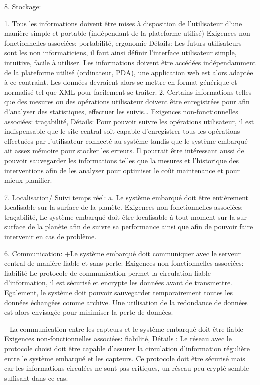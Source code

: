 8. Stockage:

1. Tous les informations doivent être mises à disposition de l'utilisateur d'une manière simple et portable (indépendant de la plateforme utilisé)
Exigences non-fonctionnelles associées: portabilité,  ergonomie
Détails: Les futurs utilisateurs sont les non informaticiens, il faut ainsi définir l’interface utilisateur simple, intuitive, facile à utiliser. Les informations doivent être accédées indépendamment de la plateforme utilisé (ordinateur, PDA), une application web est alors adaptée à ce contraint.  Les données devraient alors se mettre en format générique et normalisé tel que XML pour facilement se traiter.
2. Certains informations telles que des mesures ou des opérations utilisateur doivent être enregistrées pour afin d’analyser des statistiques, effectuer les suivis… 
Exigences non-fonctionnelles associées: traçabilité, 
Détails: Pour pouvoir suivre les opérations utilisateur, il est indispensable que le site central soit capable d’enregistrer tous les opérations effectuées par l’utilisateur connecté au système tandis que le système embarqué ait assez mémoire pour stocker les erreurs. Il pourrait être intéressant aussi de pouvoir sauvegarder les informations telles que la mesures et l’historique des interventions afin de les analyser pour optimiser le coût maintenance et pour mieux planifier.  

7. Localisation/ Suivi temps réel:
 a. Le système embarqué doit être entièrement localisable sur la surface de la planète. 
Exigences non-fonctionnelles associées: traçabilité, 
Le système embarqué doit être localisable à tout moment sur la sur surface de la planète afin de suivre sa performance ainsi que afin de pouvoir faire intervenir en cas de problème. 

6. Communication:
+Le système embarqué doit communiquer avec le serveur central de manière fiable et sans perte:
Exigences non-fonctionnelles associées: fiabilité 
Le protocole de communication permet la circulation fiable d’information, il est sécurisé et encrypte les données avant de transmettre. Egalement, le système doit pouvoir sauvegarder temporairement toutes les données échangées comme archive. Une utilisation de la redondance de données est alors envisagée pour minimiser la perte de données.


+La communication entre les capteurs et le système embarqué doit être fiable 
Exigences non-fonctionnelles associées: fiabilité, 
Détails : Le réseau avec le protocole choisi doit être capable d’assurer la circulation d’information régulière entre le système embarqué et les capteurs. Ce protocole doit être sécurisé mais car les informations circulées ne sont pas critiques, un réseau peu crypté semble suffisant dans ce cas.


